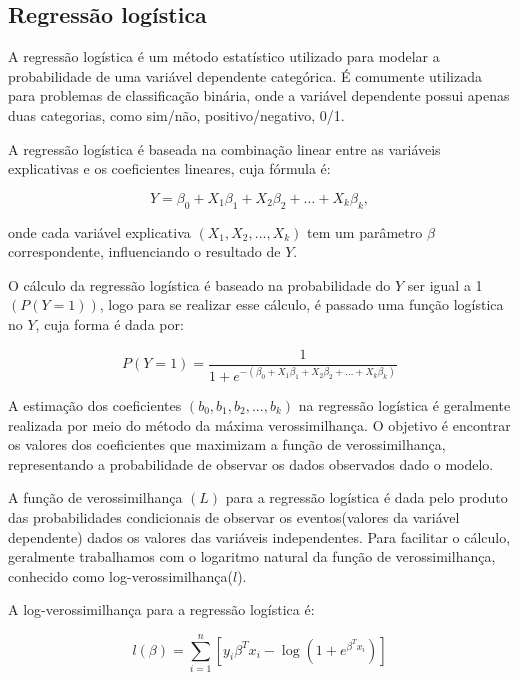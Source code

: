 
 \subsection{Regressão logística}
 A regressão logística é um método estatístico utilizado para modelar a probabilidade de uma variável 
dependente categórica. É comumente utilizada para problemas de classificação binária, onde a variável
dependente possui apenas duas categorias, como sim/não, positivo/negativo, 0/1.

A regressão logística é baseada na combinação linear entre as variáveis explicativas e os coeficientes lineares, cuja fórmula é:

\begin{equation}
Y = \beta_0 + X_{1}\beta_1 + X_{2}\beta_2 + \ldots +X_{k}\beta_k ,
\end{equation}
 
 onde cada variável explicativa $(X_1, X_2, ..., X_k)$ tem um parâmetro $\beta$ correspondente, influenciando o resultado de $Y$.

O cálculo da regressão logística é baseado na probabilidade do $Y$ ser igual a 1 $(P(Y=1))$, logo para se realizar 
esse cálculo, é passado uma função logística no $Y$, cuja forma é dada por:

\begin{equation}
  P(Y=1) = \frac{1}{1 + e^{-(\beta_0 + X_{1}\beta_1 + X_{2}\beta_2 + \ldots +X_{k}\beta_k)}}
\end{equation}

A estimação dos coeficientes $(b_0, b_1, b_2, ..., b_k)$  na regressão logística é geralmente realizada por meio 
do método da máxima verossimilhança. O objetivo é encontrar os valores dos coeficientes que maximizam a função de
 verossimilhança, representando a probabilidade de observar os dados observados dado o modelo.
 
A função de verossimilhança $(L)$ para a regressão logística é dada pelo produto das probabilidades condicionais
de observar os eventos(valores da variável dependente) dados os valores das variáveis independentes. Para facilitar o cálculo, 
geralmente trabalhamos com o logaritmo natural da função de verossimilhança, conhecido como log-verossimilhança($l$).

A log-verossimilhança para a regressão logística é:

\begin{equation}
  l(\beta) = \sum_{i=1}^{n} [y_i \beta^T x_i - \log(1 + e^{\beta^T x_i})]
\end{equation}


